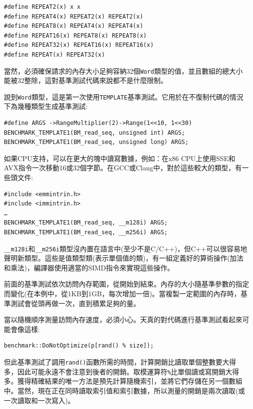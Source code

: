 \begin{lstlisting}[style=styleCXX]
#define REPEAT2(x) x x
#define REPEAT4(x) REPEAT2(x) REPEAT2(x)
#define REPEAT8(x) REPEAT4(x) REPEAT4(x)
#define REPEAT16(x) REPEAT8(x) REPEAT8(x)
#define REPEAT32(x) REPEAT16(x) REPEAT16(x)
#define REPEAT(x) REPEAT32(x)
\end{lstlisting}

當然，必須確保請求的內存大小足夠容納32個\texttt{Word}類型的值，並且數組的總大小能被32整除，這對基準測試代碼來說都不是什麼限制。

說到\texttt{Word}類型，這是第一次使用\texttt{TEMPLATE}基準測試。它用於在不復制代碼的情況下為幾種類型生成基準測試:

\begin{lstlisting}[style=styleCXX]
#define ARGS ->RangeMultiplier(2)->Range(1<<10, 1<<30)
BENCHMARK_TEMPLATE1(BM_read_seq, unsigned int) ARGS;
BENCHMARK_TEMPLATE1(BM_read_seq, unsigned long) ARGS;
\end{lstlisting}

如果CPU支持，可以在更大的塊中讀寫數據，例如：在x86 CPU上使用SSE和AVX指令一次移動16或32個字節。在GCC或Clang中，對於這些較大的類型，有一些頭文件:

\begin{lstlisting}[style=styleCXX]
#include <emmintrin.h>
#include <immintrin.h>
…
BENCHMARK_TEMPLATE1(BM_read_seq, __m128i) ARGS;
BENCHMARK_TEMPLATE1(BM_read_seq, __m256i) ARGS;
\end{lstlisting}

\texttt{\_\_m128i}和\texttt{\_\_m256i}類型沒內置在語言中(至少不是C/C++)，但C++可以很容易地聲明新類型。這些是值類型類(表示單個值的類)，有一組定義好的算術操作(加法和乘法)，編譯器使用適當的SIMD指令來實現這些操作。

前面的基準測試依次訪問內存範圍，從開始到結束。內存的大小隨基準參數的指定而變化(在本例中，從1KB到1GB，每次增加一倍)。當複製一定範圍的內存時，基準測試會從頭再做一次，直到積累足夠的量。

當以隨機順序測量訪問內存速度，必須小心。天真的對代碼進行基準測試看起來可能會像這樣:

\begin{lstlisting}[style=styleCXX]
benchmark::DoNotOptimize(p[rand() % size]);
\end{lstlisting}

但此基準測試了調用\texttt{rand()}函數所需的時間，計算開銷比讀取單個整數要大得多，因此可能永遠不會注意到後者的開銷。取模運算符\texttt{\%}比單個讀或寫開銷大得多。獲得精確結果的唯一方法是預先計算隨機索引，並將它們存儲在另一個數組中。當然，現在正在同時讀取索引值和索引數據，所以測量的開銷是兩次讀取(或一次讀取和一次寫入)。

